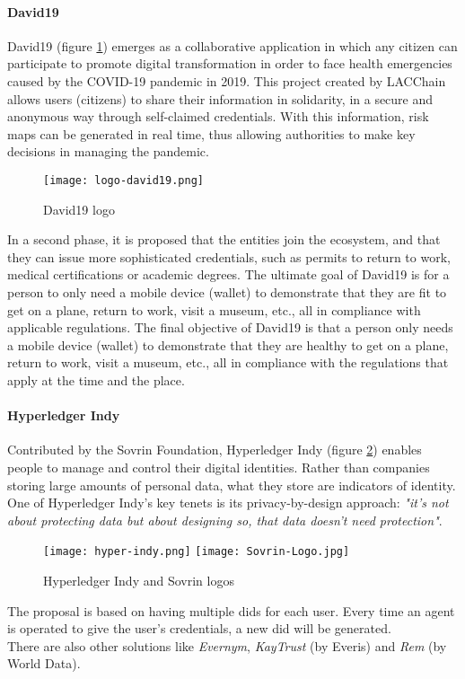 \paragraph{David19}
David19\cite{david19} (figure \ref{fig:david19}) emerges as a collaborative application in which any citizen can participate to promote digital transformation in order to face health emergencies caused by the COVID-19 pandemic in 2019. This project created by LACChain\cite{lacchain} allows users (citizens) to share their information in solidarity, in a secure and anonymous way through self-claimed credentials. With this information, risk maps can be generated in real time, thus allowing authorities to make key decisions in managing the pandemic.\\
\begin{figure}[h]
    \centering
    \texttt{[image: logo-david19.png]}
    \caption{David19 logo}
    \label{fig:david19}
\end{figure}

In a second phase\cite{que-es-david19}, it is proposed that the entities join the ecosystem, and that they can issue more sophisticated credentials, such as permits to return to work, medical certifications or academic degrees. The ultimate goal of David19 is for a person to only need a mobile device (wallet) to demonstrate that they are fit to get on a plane, return to work, visit a museum, etc., all in compliance with applicable regulations. The final objective of David19 is that a person only needs a mobile device (wallet) to demonstrate that they are healthy to get on a plane, return to work, visit a museum, etc., all in compliance with the regulations that apply at the time and the place.

\paragraph{Hyperledger Indy}
Contributed by the Sovrin Foundation\cite{sovrin-yt,sovrin}, Hyperledger Indy\cite{indy-gh,indy} (figure \ref{fig:indy}) enables people to manage and control their digital identities. Rather than companies storing large amounts of personal data, what they store are indicators of identity. One of Hyperledger Indy's key tenets is its privacy-by-design approach: \textit{"it's not about protecting data but about designing so, that data doesn't need protection"}.\\
\begin{figure}[h]
    \centering
    \texttt{[image: hyper-indy.png]}
    \texttt{[image: Sovrin-Logo.jpg]}\hfill
    \caption{Hyperledger Indy and Sovrin logos}
    \label{fig:indy}
\end{figure}

The proposal is based on having multiple \acrshort{did}s for each user. Every time an agent is operated to give the user's credentials, a new \acrshort{did} will be generated.\\

There are also other solutions\cite{ssi-wallets} like \textit{Evernym}, \textit{KayTrust} (by Everis) and \textit{Rem} (by World Data).

